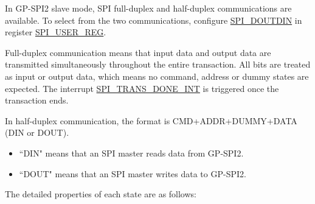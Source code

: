 \documentclass[main\_\_EN.tex]{subfiles}
\begin{document}
In GP-SPI2 slave mode, SPI full-duplex and half-duplex communications are available. To select from the two communications, configure \hyperref[fielddesc:SPIDOUTDIN]{SPI\_DOUTDIN} in register \hyperref[regdesc:SPIUSERREG]{SPI\_USER\_REG}.

Full-duplex communication means that input data and output data are transmitted simultaneously throughout the entire transaction. All bits are treated as input or output data, which means no command, address or dummy states are expected. The interrupt \hyperref[int:SPITRANSDONEINT]{SPI\_TRANS\_DONE\_INT} is triggered once the transaction ends.

In half-duplex communication, the format is CMD+ADDR+DUMMY+DATA (DIN or DOUT).
\begin{itemize}
    \item ``DIN" means that an SPI master reads data from GP-SPI2.
    \item ``DOUT" means that an SPI master writes data to GP-SPI2.
\end{itemize}

The detailed properties of each state are as follows:
\end{document}
